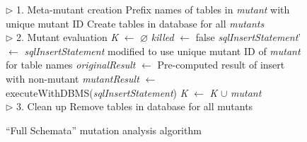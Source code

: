 
\begin{figure}[p]
\begin{algorithmic}
\footnotesize

\State $\triangleright$ 1. Meta-mutant creation
	\State Prefix names of tables in \emph{mutant} with unique mutant ID
\EndFor
\State Create tables in database for all \emph{mutants}
\\

\State $\triangleright$ 2. Mutant evaluation
\State \emph{K} $ \gets $ \emph{$\varnothing$}
	\State \emph{killed} $\gets$ false
		\State \emph{sqlInsertStatement}' $ \gets $ \emph{sqlInsertStatement} modified to use unique mutant ID of \emph{mutant} for table names 
		\State \emph{originalResult} $ \gets $ Pre-computed result of insert with non-mutant 
		\State \emph{mutantResult} $ \gets $ executeWithDBMS(\emph{sqlInsertStatement})
			\State \emph{K} $ \gets $ \emph{K} $\cup$ \emph{mutant}
		\EndIf
	\EndFor
\EndFor
\\

\State $\triangleright$ 3. Clean up
\State Remove tables in database for all mutants

\end{algorithmic}

\caption{\label{alg:original}``Full Schemata'' mutation analysis algorithm}
\vspace{-1em}
\end{figure}
